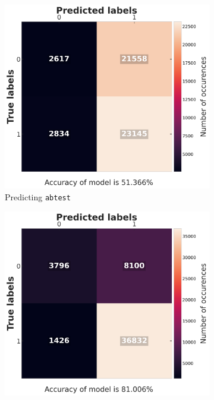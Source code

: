 \begin{figure}[h]
	\begin{center}
		\begin{subfigure}{0.32\textwidth}
			\includegraphics[width=0.99\linewidth]{./images/fig_9_logistic_abtest.png} 
			\caption{Predicting \texttt{abtest}}
		\end{subfigure}
		\begin{subfigure}{0.32\textwidth}
			\includegraphics[width=0.99\linewidth]{./images/fig_10_logistic_gearbox.png} 

\end{subfigure}
\end{center}
\end{figure}
